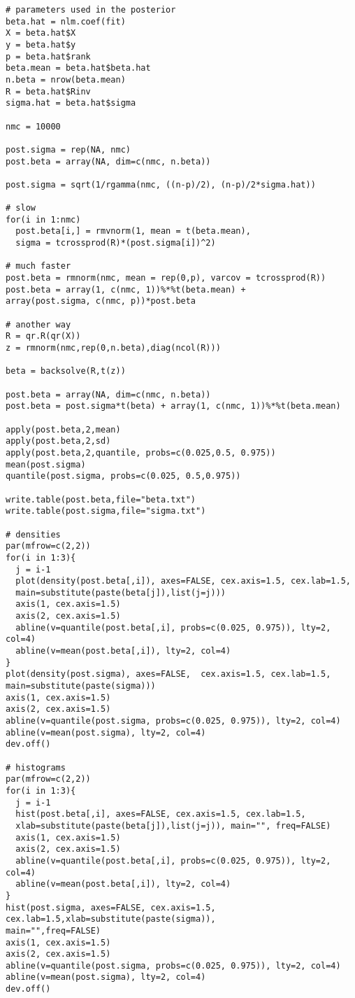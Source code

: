 \documentclass[a4paper, 11pt]{article}
\begin{document}
\begin{verbatim}
# parameters used in the posterior
beta.hat = nlm.coef(fit)
X = beta.hat$X
y = beta.hat$y
p = beta.hat$rank
beta.mean = beta.hat$beta.hat
n.beta = nrow(beta.mean)
R = beta.hat$Rinv
sigma.hat = beta.hat$sigma

nmc = 10000

post.sigma = rep(NA, nmc)
post.beta = array(NA, dim=c(nmc, n.beta))

post.sigma = sqrt(1/rgamma(nmc, ((n-p)/2), (n-p)/2*sigma.hat))

# slow
for(i in 1:nmc)
  post.beta[i,] = rmvnorm(1, mean = t(beta.mean), 
  sigma = tcrossprod(R)*(post.sigma[i])^2)

# much faster
post.beta = rmnorm(nmc, mean = rep(0,p), varcov = tcrossprod(R))
post.beta = array(1, c(nmc, 1))%*%t(beta.mean) + 
array(post.sigma, c(nmc, p))*post.beta

# another way
R = qr.R(qr(X))
z = rmnorm(nmc,rep(0,n.beta),diag(ncol(R))) 

beta = backsolve(R,t(z))

post.beta = array(NA, dim=c(nmc, n.beta))
post.beta = post.sigma*t(beta) + array(1, c(nmc, 1))%*%t(beta.mean)

apply(post.beta,2,mean)
apply(post.beta,2,sd)
apply(post.beta,2,quantile, probs=c(0.025,0.5, 0.975))
mean(post.sigma)
quantile(post.sigma, probs=c(0.025, 0.5,0.975))

write.table(post.beta,file="beta.txt")
write.table(post.sigma,file="sigma.txt")

# densities
par(mfrow=c(2,2))
for(i in 1:3){
  j = i-1
  plot(density(post.beta[,i]), axes=FALSE, cex.axis=1.5, cex.lab=1.5,
  main=substitute(paste(beta[j]),list(j=j)))
  axis(1, cex.axis=1.5)
  axis(2, cex.axis=1.5)
  abline(v=quantile(post.beta[,i], probs=c(0.025, 0.975)), lty=2, col=4)
  abline(v=mean(post.beta[,i]), lty=2, col=4)
}
plot(density(post.sigma), axes=FALSE,  cex.axis=1.5, cex.lab=1.5,
main=substitute(paste(sigma)))
axis(1, cex.axis=1.5)
axis(2, cex.axis=1.5)
abline(v=quantile(post.sigma, probs=c(0.025, 0.975)), lty=2, col=4)
abline(v=mean(post.sigma), lty=2, col=4)
dev.off()

# histograms
par(mfrow=c(2,2))
for(i in 1:3){
  j = i-1
  hist(post.beta[,i], axes=FALSE, cex.axis=1.5, cex.lab=1.5,
  xlab=substitute(paste(beta[j]),list(j=j)), main="", freq=FALSE)
  axis(1, cex.axis=1.5)
  axis(2, cex.axis=1.5)
  abline(v=quantile(post.beta[,i], probs=c(0.025, 0.975)), lty=2, col=4)
  abline(v=mean(post.beta[,i]), lty=2, col=4)
}
hist(post.sigma, axes=FALSE, cex.axis=1.5, cex.lab=1.5,xlab=substitute(paste(sigma)),
main="",freq=FALSE)
axis(1, cex.axis=1.5)
axis(2, cex.axis=1.5)
abline(v=quantile(post.sigma, probs=c(0.025, 0.975)), lty=2, col=4)
abline(v=mean(post.sigma), lty=2, col=4)
dev.off()


\end{verbatim}
\end{document}
